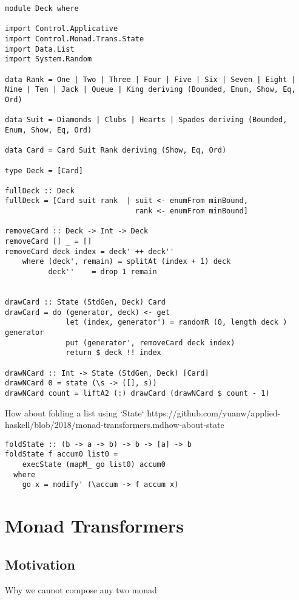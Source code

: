 \begin{verbatim}
module Deck where

import Control.Applicative
import Control.Monad.Trans.State
import Data.List
import System.Random

data Rank = One | Two | Three | Four | Five | Six | Seven | Eight | Nine | Ten | Jack | Queue | King deriving (Bounded, Enum, Show, Eq, Ord)

data Suit = Diamonds | Clubs | Hearts | Spades deriving (Bounded, Enum, Show, Eq, Ord)

data Card = Card Suit Rank deriving (Show, Eq, Ord)

type Deck = [Card]

fullDeck :: Deck
fullDeck = [Card suit rank  | suit <- enumFrom minBound,
                              rank <- enumFrom minBound]

removeCard :: Deck -> Int -> Deck
removeCard [] _ = []
removeCard deck index = deck' ++ deck''
    where (deck', remain) = splitAt (index + 1) deck
          deck''    = drop 1 remain


drawCard :: State (StdGen, Deck) Card
drawCard = do (generator, deck) <- get
              let (index, generator') = randomR (0, length deck ) generator
              put (generator', removeCard deck index)
              return $ deck !! index

drawNCard :: Int -> State (StdGen, Deck) [Card]
drawNCard 0 = state (\s -> ([], s))
drawNCard count = liftA2 (:) drawCard (drawNCard $ count - 1)
\end{verbatim}

How about folding a list using `State`
https://github.com/yuanw/applied-haskell/blob/2018/monad-transformers.mdhow-about-state


\begin{verbatim}
foldState :: (b -> a -> b) -> b -> [a] -> b
foldState f accum0 list0 =
    execState (mapM_ go list0) accum0
  where
    go x = modify' (\accum -> f accum x)
\end{verbatim}

\section{Monad Transformers}
\subsection{Motivation} Why we cannot compose any two monad

